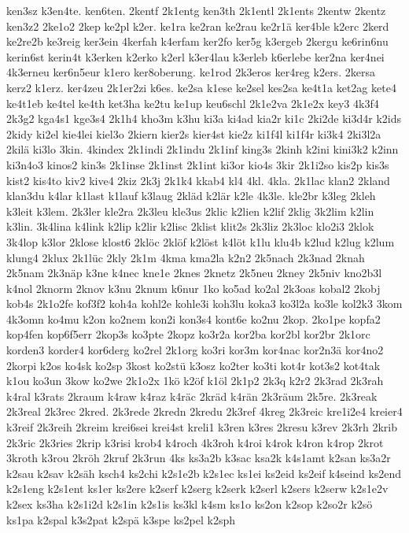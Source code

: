 {ken3sz
k3en4te.
ken6ten.
2kentf
2k1entg
ken3th
2k1entl
2k1ents
2kentw
2kentz
ken3z2
2ke1o2
2kep
ke2pl
k2er.
ke1ra
ke2ran
ke2rau
ke2r1ä
ker4ble
k2erc
2kerd
ke2re2b
ke3reig
ker3ein
4kerfah
k4erfam
ker2fo
ker5g
k3ergeb
2kergu
ke6rin6nu
kerin6st
kerin4t
k3erken
k2erko
k2erl
k3er4lau
k3erleb
k6erlebe
ker2na
ker4nei
4k3erneu
ker6n5eur
k1ero
ker8oberung.
ke1rod
2k3eros
ker4reg
k2ers.
2kersa
kerz2
k1erz.
ker4zeu
2k1er2zi
k6es.
ke2sa
k1ese
ke2sel
kes2sa
ke4t1a
ket2ag
kete4
ke4t1eb
ke4tel
ke4th
ket3ha
ke2tu
ke1up
keu6schl
2k1e2va
2k1e2x
key3
4k3f4
2k3g2
kga4s1
kge3s4
2k1h4
kho3m
k3hu
ki3a
ki4ad
kia2r
ki1c
2ki2de
ki3d4r
k2ids
2kidy
ki2el
kie4lei
kiel3o
2kiern
kier2s
kier4st
kie2z
ki1f4l
ki1f4r
ki3k4
2ki3l2a
2kilä
ki3lo
3kin.
4kindex
2k1indi
2k1indu
2k1inf
king3s
2kinh
k2ini
kini3k2
k2inn
ki3n4o3
kinos2
kin3s
2k1inse
2k1inst
2k1int
ki3or
kio4s
3kir
2k1i2so
kis2p
kis3s
kist2
kis4to
kiv2
kive4
2kiz
2k3j
2k1k4
kkab4
kl4
4kl.
4kla.
2k1lac
klan2
2kland
klan3du
k4lar
k1last
k1lauf
k3laug
2kläd
k2lär
k2le
4k3le.
kle2br
k3leg
2kleh
k3leit
k3lem.
2k3ler
kle2ra
2k3leu
kle3us
2klic
k2lien
k2lif
2klig
3k2lim
k2lin
k3lin.
3k4lina
k4link
k2lip
k2lir
k2lisc
2klist
klit2s
2k3liz
2k3loc
klo2i3
2klok
3k4lop
k3lor
2klose
klost6
2klöc
2klöf
k2löst
k4löt
k1lu
klu4b
k2lud
k2lug
k2lum
klung4
2klux
2k1lüc
2kly
2k1m
4kma
kma2la
k2n2
2k5nach
2k3nad
2knah
2k5nam
2k3näp
k3ne
k4nec
kne1e
2knes
2knetz
2k5neu
2kney
2k5niv
kno2b3l
k4nol
2knorm
2knov
k3nu
2knum
k6nur
1ko
ko5ad
ko2al
2k3oas
kobal2
2kobj
kob4s
2k1o2fe
kof3f2
koh4a
kohl2e
kohle3i
koh3lu
koka3
ko3l2a
ko3le
kol2k3
3kom
4k3omn
ko4mu
k2on
ko2nem
kon2i
kon3s4
kont6e
ko2nu
2kop.
2ko1pe
kopfa2
kop4fen
kop6f5err
2kop3s
ko3pte
2kopz
ko3r2a
kor2ba
kor2bl
kor2br
2k1orc
korden3
korder4
kor6derg
ko2rel
2k1org
ko3ri
kor3m
kor4nac
kor2n3ä
kor4no2
2korpi
k2os
ko4sk
ko2sp
3kost
ko2stü
k3osz
ko2ter
ko3ti
kot4r
kot3s2
kot4tak
k1ou
ko3un
3kow
ko2we
2k1o2x
1kö
k2öf
k1öl
2k1p2
2k3q
k2r2
2k3rad
2k3rah
k4ral
k3rats
2kraum
k4raw
k4raz
k4räc
2kräd
k4rän
2k3räum
2k5re.
2k3reak
2k3real
2k3rec
2kred.
2k3rede
2kredn
2kredu
2k3ref
4kreg
2k3reic
kre1i2e4
kreier4
k3reif
2k3reih
2kreim
krei6sei
krei4st
kreli1
k3ren
k3res
2kresu
k3rev
2k3rh
2krib
2k3ric
2k3ries
2krip
k3risi
krob4
k4roch
4k3roh
k4roi
k4rok
k4ron
k4rop
2krot
3kroth
k3rou
2kröh
2kruf
2k3run
4ks
ks3a2b
k3sac
ksa2k
k4s1amt
k2san
ks3a2r
k2sau
k2sav
k2säh
ksch4
ks2chi
k2s1e2b
k2s1ec
ks1ei
ks2eid
ks2eif
k4seind
ks2end
k2s1eng
k2s1ent
ks1er
ks2ere
k2serf
k2serg
k2serk
k2serl
k2sers
k2serw
k2s1e2v
k2sex
ks3ha
k2s1i2d
k2s1in
k2s1is
ks3kl
k4sm
ks1o
ks2on
k2sop
k2so2r
k2sö
ks1pa
k2spal
k3s2pat
k2spä
k3spe
ks2pel
k2sph
}
